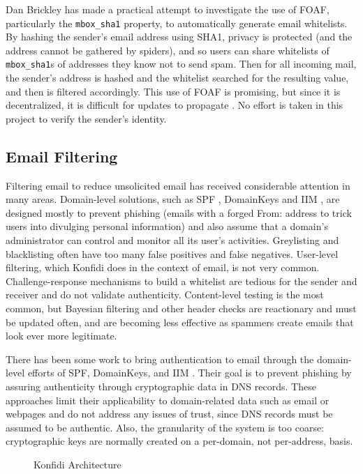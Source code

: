 \documentclass[letterpaper]{www2006-submission}
\begin{document}
Dan Brickley has made a practical attempt to investigate the use of FOAF, particularly the \texttt{mbox\_sha1} property, to automatically generate email whitelists. By hashing the sender's email address using SHA1, privacy is protected (and the address cannot be gathered by spiders), and so users can share whitelists of \texttt{mbox\_sha1}s of addresses they know not to send spam. Then for all incoming mail, the sender's address is hashed and the whitelist searched for the resulting value, and then is filtered accordingly. This use of FOAF is promising, but since it is decentralized, it is difficult for updates to propagate \citep{foafWhitelisting}. No effort is taken in this project to verify the sender's identity.

\subsection{Email Filtering}
Filtering email to reduce unsolicited email has received considerable attention in many areas.  Domain-level solutions, such as SPF \citep{spf}, DomainKeys \citep{domainkeys} and IIM \citep{iim}, are designed mostly to prevent phishing (emails with a forged From: address to trick users into divulging personal information) and also assume that a domain's administrator can control and monitor all its user's activities. Greylisting and blacklisting often have too many false positives and false negatives. User-level filtering, which Konfidi does in the context of email, is not very common. Challenge-response mechanisms to build a whitelist are tedious for the sender and receiver and do not validate authenticity. Content-level testing is the most common, but Bayesian filtering and other header checks are reactionary and must be updated often, and are becoming less effective as spammers create emails that look ever more legitimate.

There has been some work to bring authentication to email through the domain-level efforts of SPF, DomainKeys, and IIM \citep{iim}.  Their goal is to prevent phishing by assuring authenticity through cryptographic data in DNS records.  These approaches limit their applicability to domain-related data such as email or webpages and do not address any issues of trust, since DNS records must be assumed to be authentic.  Also, the granularity of the system is too coarse: cryptographic keys are normally created on a per-domain, not per-address, basis.

\begin{figure*}[htp]
\centering
{}
\caption{Konfidi Architecture}
\label{fig:arch}
\end{figure*}
\end{document}
